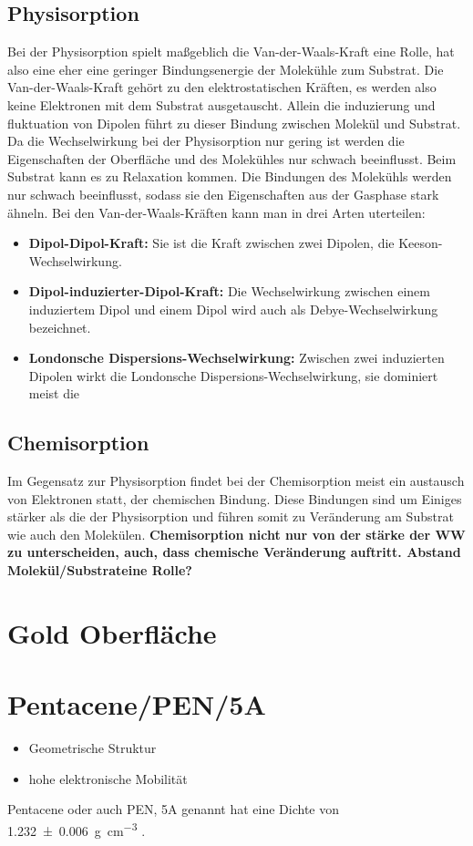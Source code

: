     \subsection{Physisorption}
        Bei der Physisorption spielt maßgeblich die Van-der-Waals-Kraft eine Rolle, hat also eine eher eine geringer Bindungsenergie der Molekühle zum Substrat.
        Die Van-der-Waals-Kraft gehört zu den elektrostatischen Kräften, es werden also keine Elektronen mit dem Substrat ausgetauscht.
        Allein die induzierung und fluktuation von Dipolen führt zu dieser Bindung zwischen Molekül und Substrat.
        Da die Wechselwirkung bei der Physisorption nur gering ist werden die Eigenschaften der Oberfläche und des Molekühles nur schwach beeinflusst.
        Beim Substrat kann es zu Relaxation kommen.
        Die Bindungen des Molekühls werden nur schwach beeinflusst, sodass sie den Eigenschaften aus der Gasphase stark ähneln.
        Bei den Van-der-Waals-Kräften kann man in drei Arten uterteilen:
        \begin{itemize}
            \item \textbf{Dipol-Dipol-Kraft:} Sie ist die Kraft zwischen zwei Dipolen, die Keeson-Wechselwirkung.
            \item \textbf{Dipol-induzierter-Dipol-Kraft:} Die Wechselwirkung zwischen einem induziertem Dipol und einem Dipol wird auch als Debye-Wechselwirkung bezeichnet.
            \item \textbf{Londonsche Dispersions-Wechselwirkung:} Zwischen zwei induzierten Dipolen wirkt die Londonsche Dispersions-Wechselwirkung, sie dominiert meist die 
        \end{itemize}

    
    \subsection{Chemisorption}
        Im Gegensatz zur Physisorption findet bei der Chemisorption meist ein austausch von Elektronen statt, der chemischen Bindung.
        Diese Bindungen sind um Einiges stärker als die der Physisorption und führen somit zu Veränderung am Substrat wie auch den Molekülen.
        \textbf{Chemisorption nicht nur von der stärke der WW zu unterscheiden, auch, dass chemische Veränderung auftritt.
        Abstand Molekül/Substrateine Rolle?}
        
\section{Gold Oberfläche}

\section{Pentacene/PEN/5A}
\begin{itemize}
    \item Geometrische Struktur
    \item hohe elektronische Mobilität
\end{itemize}
Pentacene oder auch PEN, 5A genannt hat eine Dichte von \SI{1.232(6)}{\gram\per\cubic\centi\meter} \cite{CAS}.
